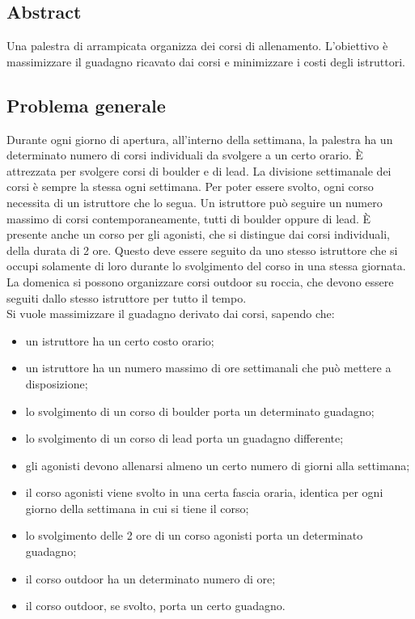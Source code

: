 \subsection{Abstract}
Una palestra di arrampicata organizza dei corsi di allenamento. L'obiettivo è massimizzare il guadagno ricavato dai corsi e minimizzare i costi degli istruttori.

\subsection{Problema generale}
Durante ogni giorno di apertura, all'interno della settimana, la palestra ha un determinato numero di corsi individuali da svolgere a un certo orario. È attrezzata per svolgere corsi di boulder e di lead. La divisione settimanale dei corsi è sempre la stessa ogni settimana. Per poter essere svolto, ogni corso necessita di un istruttore che lo segua. Un istruttore può seguire un numero massimo di corsi contemporaneamente, tutti di boulder oppure di lead. È presente anche un corso per gli agonisti, che si distingue dai corsi individuali, della durata di 2 ore. Questo deve essere seguito da uno stesso istruttore che si occupi solamente di loro durante lo svolgimento del corso in una stessa giornata. La domenica si possono organizzare corsi outdoor su roccia, che devono essere seguiti dallo stesso istruttore per tutto il tempo. \\
Si vuole massimizzare il guadagno derivato dai corsi, sapendo che:
\begin{itemize}
	\item un istruttore ha un certo costo orario;
	\item un istruttore ha un numero massimo di ore settimanali che può mettere a disposizione;
	\item lo svolgimento di un corso di boulder porta un determinato guadagno;
	\item lo svolgimento di un corso di lead porta un guadagno differente;
	\item gli agonisti devono allenarsi almeno un certo numero di giorni alla settimana;
	\item il corso agonisti viene svolto in una certa fascia oraria, identica per ogni giorno della settimana in cui si tiene il corso;
	\item lo svolgimento delle 2 ore di un corso agonisti porta un determinato guadagno;
	\item il corso outdoor ha un determinato numero di ore;
	\item il corso outdoor, se svolto, porta un certo guadagno.
\end{itemize}
